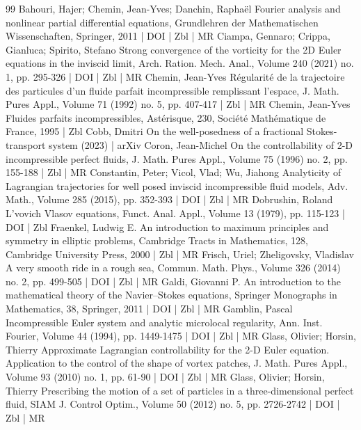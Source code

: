 \begin{thebibliography}{99}
 Bahouri, Hajer; Chemin, Jean-Yves; Danchin, Raphaël Fourier analysis and nonlinear partial differential equations, Grundlehren der Mathematischen Wissenschaften, Springer, 2011 | DOI | Zbl | MR
 Ciampa, Gennaro; Crippa, Gianluca; Spirito, Stefano Strong convergence of the vorticity for the 2D Euler equations in the inviscid limit, Arch. Ration. Mech. Anal., Volume 240 (2021) no. 1, pp. 295-326 | DOI | Zbl | MR
 Chemin, Jean-Yves Régularité de la trajectoire des particules d’un fluide parfait incompressible remplissant l’espace, J. Math. Pures Appl., Volume 71 (1992) no. 5, pp. 407-417 | Zbl | MR
 Chemin, Jean-Yves Fluides parfaits incompressibles, Astérisque, 230, Société Mathématique de France, 1995 | Zbl
 Cobb, Dmitri On the well-posedness of a fractional Stokes-transport system (2023) | arXiv
 Coron, Jean-Michel On the controllability of 2-D incompressible perfect fluids, J. Math. Pures Appl., Volume 75 (1996) no. 2, pp. 155-188 | Zbl | MR
 Constantin, Peter; Vicol, Vlad; Wu, Jiahong Analyticity of Lagrangian trajectories for well posed inviscid incompressible fluid models, Adv. Math., Volume 285 (2015), pp. 352-393 | DOI | Zbl | MR
 Dobrushin, Roland L’vovich Vlasov equations, Funct. Anal. Appl., Volume 13 (1979), pp. 115-123 | DOI | Zbl
 Fraenkel, Ludwig E. An introduction to maximum principles and symmetry in elliptic problems, Cambridge Tracts in Mathematics, 128, Cambridge University Press, 2000 | Zbl | MR
 Frisch, Uriel; Zheligovsky, Vladislav A very smooth ride in a rough sea, Commun. Math. Phys., Volume 326 (2014) no. 2, pp. 499-505 | DOI | Zbl | MR
 Galdi, Giovanni P. An introduction to the mathematical theory of the Navier–Stokes equations, Springer Monographs in Mathematics, 38, Springer, 2011 | DOI | Zbl | MR
 Gamblin, Pascal Incompressible Euler system and analytic microlocal regularity, Ann. Inst. Fourier, Volume 44 (1994), pp. 1449-1475 | DOI | Zbl | MR
 Glass, Olivier; Horsin, Thierry Approximate Lagrangian controllability for the 2-D Euler equation. Application to the control of the shape of vortex patches, J. Math. Pures Appl., Volume 93 (2010) no. 1, pp. 61-90 | DOI | Zbl | MR
 Glass, Olivier; Horsin, Thierry Prescribing the motion of a set of particles in a three-dimensional perfect fluid, SIAM J. Control Optim., Volume 50 (2012) no. 5, pp. 2726-2742 | DOI | Zbl | MR

\end{thebibliography}
